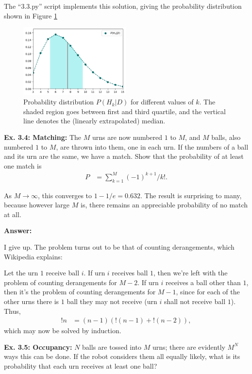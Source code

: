 \documentclass{article}
\begin{document}
The ``3.3.py'' script implements this solution, giving the probability distribution shown in Figure \ref{fig:3.3}
\begin{figure}[h]
	\center
	\includegraphics[width=0.5\textwidth]{Numerical/3.3.png}
	\caption{Probability distribution $P(H_k|D)$ for different values of $k$. The shaded region goes between first and third quartile, and the vertical line denotes the (linearly extrapolated) median.}
	\label{fig:3.3}
\end{figure}

\textbf{Ex. 3.4: Matching: }The $M$ urns are now numbered $1$ to $M$, and $M$ balls, also numbered $1$ to $M$, are thrown into them, one in each urn. If the numbers of a ball and its urn are the same, we have a match. Show that the probability of at least one match is
\begin{align*}
	P&=\sum_{k=1}^M(-1)^{k+1}/k!.
\end{align*}

As $M\rightarrow\infty$, this converges to $1-1/e=0.632$. The result is surprising to many, because however large $M$ is, there remains an appreciable probability of no match at all.

\textbf{Answer:}

I give up. The problem turns out to be that of counting derangements, which Wikipedia explains:

Let the urn $1$ receive ball $i$. If urn $i$ receives ball $1$, then we're left with the problem of counting derangements for $M-2$.
If urn $i$ receives a ball other than $1$, then it's the problem of counting derangements for $M-1$, since for each of the other urns there is $1$ ball they may not receive (urn $i$ shall not receive ball $1$). Thus,
\begin{align}
	!n&=(n-1)(!(n-1)+!(n-2)),
\end{align}
which may now be solved by induction.

\textbf{Ex. 3.5: Occupancy: }$N$ balls are tossed into $M$ urns; there are evidently $M^N$ ways this can be done. If the robot considers them all equally likely, what is its probability that each urn receives at least one ball?
\end{document}
